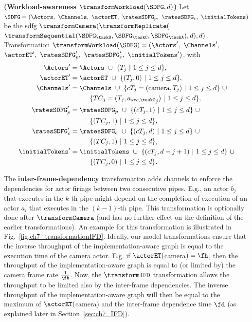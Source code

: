 \begin{definition}
{\textbf{(Workload-awareness $\transformWorkload(\SDFG,d)$)}}
Let $\SDFG = (\Actors,\ \Channels,\ \actorET,\ \ratesSDFG_p,\ \ratesSDFG_c,\ \initialTokens)$ be the \gls{sdfg} $\transformCamera(\transformReplicate($ $\transformSequential(\SDFG_{\taskS},\SDFG_{\taskC},\SDFG_{\taskA}),d),d)$. 
Transformation $\transformWorkload(\SDFG)= (\Actors^{\prime},\ \Channels^{\prime},$ $ \actorET^{\prime},\ \ratesSDFG_p^{\prime},\ \ratesSDFG_c^{\prime},\ \initialTokens^{\prime})$, with
\begin{align}
\Actors^{\prime}&=\Actors\ \cup\ \{T_j\ |\ 1\le j\le d\},\nonumber\\ \actorET^{\prime}&=\actorET\ \cup\ \{(T_j,0)\ |\ 1\le j\le d\}, \nonumber\\
\Channels^{\prime}&=\Channels\ \cup\ \{cT_j=(\text{camera},T_j)\ |\ 1\le j\le d\}\  \cup \nonumber\\
&\hspace*{10mm} \{TC_j=(T_j,{a_{src,{\taskC}}}_j)\ |\ 1\le j\le d\}, \nonumber\\
\ratesSDFG_p^{\prime}&=\ratesSDFG_p\ \cup\ \{(cT_j,1)\ |\ 1\le j\le d\}\ \cup \nonumber\\
&\hspace*{10mm} 
\{(TC_j,1)\ |\ 1\le j\le d\},\nonumber\\
\ratesSDFG_c^{\prime}&=\ratesSDFG_c\ \cup\ \{(cT_j,d)\ |\ 1\le j\le d\}\ \cup \nonumber\\
&\hspace*{10mm} 
\{(TC_j,1)\ |\ 1\le j\le d\},\nonumber\\
\initialTokens^{\prime}&=\initialTokens\ \cup\ \{(cT_j,d-j+1)\ |\ 1\le j\le d\}\ \cup \nonumber\\
&\hspace*{10mm} 
\{(TC_j,0)\ |\ 1\le j\le d\}.\nonumber
\end{align}
\end{definition}

The \textbf{inter-frame-dependency} transformation adds channels to enforce the dependencies for actor firings between two consecutive pipes. 
E.g., an actor $b_j$ that executes in the $k$-th pipe might depend on the completion of execution of an actor $a_i$ that executes in the $(k-1)$-th pipe.
This transformation is optionally done after $\transformCamera$ (and has no further effect on the definition of the earlier transformations).
An example for this transformation is illustrated in Fig.~\ref{fig:ch7_transformationIFD}.
Ideally, our model transformations ensure that the inverse throughput of the implementation-aware graph is equal to the execution time of the camera actor. E.g. if $\actorET($camera$)=\fh$, then the throughput of the implementation-aware graph is equal to (or limited by) the camera frame rate $\frac{1}{\fh}$.
Now, the $\transformIFD$ transformation allows the throughput to be limited also by the inter-frame dependencies.
The inverse throughput of the implementation-aware graph will then be equal to the maximum of $\actorET($camera$)$ and the inter-frame dependence time $\fd$ (as explained later in Section~\ref{sec:ch7_IFD}).

